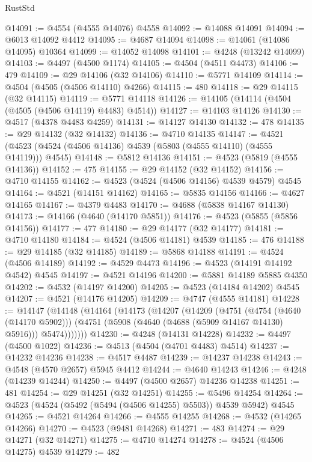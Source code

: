 \begin{lexlean}{RustStd}
\begin{coremodule}
@14091 := @4554 (@4555 @14076) @4558
@14092 := @14088 @14091
@14094 := @6013 @14092 @4412
@14095 := @4687 @14094
@14098 := @14061 (@14086 @14095) @10364
@14099 := @14052 @14098
@14101 := @4248 (@13242 @14099)
@14103 := @4497 (@4500 @1174)
@14105 := @4504 (@4511 @4473)
@14106 := 479
@14109 := @29 @14106 (@32 @14106)
@14110 := @5771 @14109
@14114 := @4504 (@4505 (@4506 @14110) @4266)
@14115 := 480
@14118 := @29 @14115 (@32 @14115)
@14119 := @5771 @14118
@14126 := @14105 (@14114 (@4504 (@4505 (@4506 @14119) @4483) @4514))
@14127 := @14103 @14126
@14130 := @4517 (@4378 @4483 @4259)
@14131 := @14127 @14130
@14132 := 478
@14135 := @29 @14132 (@32 @14132)
@14136 := @4710 @14135
@14147 := @4521 (@4523 (@4524 (@4506 @14136) @4539 (@5803 (@4555 @14110) (@4555 @14119))) @4545)
@14148 := @5812 @14136
@14151 := @4523 (@5819 (@4555 @14136))
@14152 := 475
@14155 := @29 @14152 (@32 @14152)
@14156 := @4710 @14155
@14162 := @4523 (@4524 (@4506 @14156) @4539 @4579) @4545
@14164 := @4521 (@14151 @14162)
@14165 := @5835 @14156
@14166 := @4627 @14165
@14167 := @4379 @4483
@14170 := @4688 (@5838 @14167 @14130)
@14173 := @14166 (@4640 (@14170 @5851))
@14176 := @4523 (@5855 (@5856 @14156))
@14177 := 477
@14180 := @29 @14177 (@32 @14177)
@14181 := @4710 @14180
@14184 := @4524 (@4506 @14181) @4539
@14185 := 476
@14188 := @29 @14185 (@32 @14185)
@14189 := @5868 @14188
@14191 := @4524 (@4506 @14189)
@14192 := @4529 @4473
@14196 := @4523 (@14191 @14192 @4542) @4545
@14197 := @4521 @14196
@14200 := @5881 @14189 @5885 @4350
@14202 := @4532 (@14197 @14200)
@14205 := @4523 (@14184 @14202) @4545
@14207 := @4521 (@14176 @14205)
@14209 := @4747 (@4555 @14181)
@14228 := @14147
    (@14148
      (@14164
        (@14173
          (@14207
            (@14209
              (@4751
                (@4754 (@4640 (@14170 @5902)))
                (@4751 (@5908 (@4640 (@4688 (@5909 @14167 @14130) @5916))) @5474)))))))
@14230 := @4248 (@14131 @14228)
@14232 := @4497 (@4500 @1022)
@14236 := @4513 (@4504 (@4701 @4483) @4514)
@14237 := @14232 @14236
@14238 := @4517 @4487
@14239 := @14237 @14238
@14243 := @4548 (@4570 @2657) @5945 @4412
@14244 := @4640 @14243
@14246 := @4248 (@14239 @14244)
@14250 := @4497 (@4500 @2657) @14236 @14238
@14251 := 481
@14254 := @29 @14251 (@32 @14251)
@14255 := @5496 @14254
@14264 := @4523 (@4524 (@5492 (@5494 (@4506 @14255) @5503)) @4539 @5942) @4545
@14265 := @4521 @14264
@14266 := @4555 @14255
@14268 := @4532 (@14265 @14266)
@14270 := @4523 (@9481 @14268)
@14271 := 483
@14274 := @29 @14271 (@32 @14271)
@14275 := @4710 @14274
@14278 := @4524 (@4506 @14275) @4539
@14279 := 482

\end{coremodule}
\end{lexlean}
